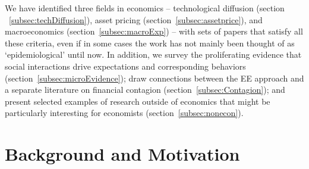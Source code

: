 We have identified three fields in economics -- technological diffusion (section ~\ref{subsec:techDiffusion}), asset pricing (section~\ref{subsec:assetprice}), and macroeconomics (section~\ref{subsec:macroExp}) -- with sets of papers that satisfy all these criteria, even if in some cases the work has not mainly been thought of as `epidemiological' until now.  In addition, we survey the proliferating evidence that social interactions drive expectations and corresponding behaviors (section~\ref{subsec:microEvidence}); draw connections between the EE approach and a separate literature on financial contagion (section~\ref{subsec:Contagion}); and present selected examples of research outside of economics that might be particularly interesting for economists (section~\ref{subsec:nonecon}).

\section{Background and Motivation}\label{motivation-and-context}
\hypertarget{EpiExpHet}{}

